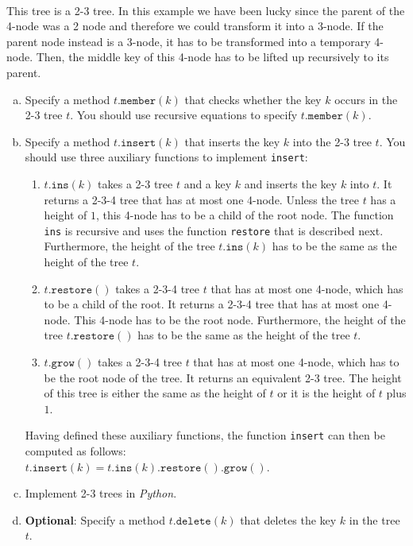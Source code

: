 \\[0.2cm]
This tree is a 2-3 tree.  In this example we have been lucky since the parent of the 4-node was
a 2 node and therefore we could transform it into a 3-node.  If the parent node instead is a 3-node,
it has to be transformed into a temporary 4-node.  Then, the middle key of this 4-node has to be
lifted up recursively to its parent.  
\begin{enumerate}[(a)]
\item Specify a method $t.\texttt{member}(k)$ that checks whether the key $k$ occurs in the 2-3 tree
      $t$.  You should use recursive equations to specify  $t.\texttt{member}(k)$.
\item Specify a method $t.\texttt{insert}(k)$ that inserts the key $k$ into the 2-3 tree
      $t$.  You should use three auxiliary functions to implement \texttt{insert}:
      \begin{enumerate}
      \item $t.\texttt{ins}(k)$ takes a 2-3 tree $t$ and a key $k$ and inserts the key $k$ into $t$.
            It returns a 2-3-4 tree that has at most one 4-node.  Unless the tree $t$ has a height of $1$, this
            4-node has to be a child of the root node.  The function \texttt{ins} is recursive and uses the
            function \texttt{restore} that is described next.
            Furthermore, the height of the tree $t.\mathtt{ins}(k)$ has to be the same as the height of the tree $t$.
      \item $t.\texttt{restore}()$ takes a 2-3-4 tree $t$ that has at most one 4-node, which has to be a child
            of the root.  It returns a 2-3-4 tree that has at most one 4-node.  This 4-node has to be the root node.
            Furthermore, the height of the tree $t.\mathtt{restore}()$ has to be the same as the height of the tree $t$.
      \item $t.\texttt{grow}()$ takes a 2-3-4 tree $t$ that has at most one 4-node, which has to be the root
            node of the tree.  It returns an equivalent 2-3 tree.  The height of this tree is either the same
            as the height of $t$ or it is the height of $t$ plus $1$.
      \end{enumerate}
      Having defined these auxiliary functions, the function \texttt{insert} can then be computed as follows:
      \\[0.2cm]
      \hspace*{1.3cm}
      $t.\texttt{insert}(k) = t.\texttt{ins}(k).\texttt{restore}().\texttt{grow}()$.
\item Implement 2-3 trees in \textsl{Python}.
\item \textbf{Optional}: Specify a method $t.\texttt{delete}(k)$ that deletes the key $k$ in the tree $t$.


\end{enumerate}
